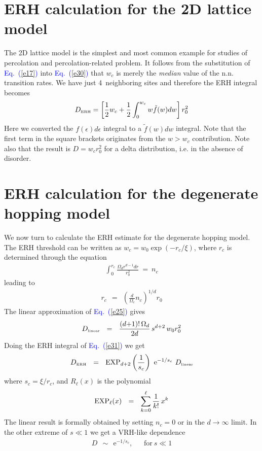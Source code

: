 \documentclass[onecolumn,fleqn,12pt,openany,draft]{book}
\newcommand{\eexp}{\mbox{e}^}
\newcommand{\tbox}[1]{\mbox{\tiny #1}}
\newcommand{\mylabel}[1]{\label{#1}}
\newcommand{\beq}{\begin{eqnarray}}
\newcommand{\eeq}{\end{eqnarray}}
\newcommand{\be}[1]{\begin{eqnarray}\ifthenelse{#1=-1}
{\nonumber}{\ifthenelse{#1=0}{}{\mylabel{e#1}}}}
\newcommand{\Eq}[1]{\textcolor{blue}{Eq.\!\!~(\ref{#1})}}
\newcommand{\Fig}[1]{\textcolor{blue}{Fig.}\!\!~\ref{#1}}
\newcommand{\hide}[1]{}
\begin{document}
\section{ERH calculation for the 2D lattice model}

The 2D lattice model is the simplest and most common example 
for studies of percolation and percolation-related problem. 
%
It follows from the substitution of \Eq{e17} into \Eq{e30}
that $w_c$ is merely the {\em median} value of the n.n. transition rates. 
We have just 4~neighboring sites and therefore the ERH integral becomes
%
\be{37}
D_{\tbox{ERH}} =  \left[\frac{1}{2}w_c + \frac{1}{2}\int_0^{w_c} w\tilde{f}(w) dw\right]r_0^2
\eeq
% 
Here we converted the $f(\epsilon)d\epsilon$ integral 
to a $\tilde{f}(w)dw$ integral.     
Note that the first term in the square brackets 
originates from the ${w>w_c}$ contribution.
Note also that the result is $D= w_c r_0^2$ for a delta 
distribution, i.e. in the absence of disorder. 


\hide{
We would like to test the validity of \Eq{e37}.
The purpose of this test is twofold: 
(i) to verify that the use of ${n_c=2}$  
indeed leads to a good estimate; 
(ii) to see whether the ERH estimate is indeed 
an improvement over the conventional estimate. 
The conventional estimate is just to use 
the median value leading to $D \approx w_c r_0^2$. 
%
For the purpose of numerical test we consider 
a uniform distribution of $\epsilon$ 
within ${[-\sigma,\sigma]}$. From \Eq{e37} we get 
%
\beq
D_{\tbox{ERH}} =  \left[\frac{1}{2} + \frac{1}{2\sigma}\left(1-\eexp{-\sigma}\right)\right] 
\, w_c \, r_0^2
\eeq
%
This formula is tested in \Fig{f3}.
}


\section{ERH calculation for the degenerate hopping model}
\label{sN}

We now turn to calculate the ERH estimate for the
degenerate hopping model. The ERH threshold 
can be written as  $w_c=w_0\exp(-r_c/\xi)$, 
where $r_c$ is determined through the equation  
%
\beq
\int_0^{r_c} \frac{\Omega_d r^{d-1} dr}{r_0^2} \ = \  n_c 
\eeq
%
leading to 
%
\beq
r_c  \ \ = \ \ \left(\frac{d}{\Omega_c}n_c\right)^{1/d}  r_0
\eeq
%
The linear approximation of \Eq{e25} gives 
%
\be{400}
D_{\tbox{linear}} \ \ = \ \  
\frac{(d{+}1)!\,\Omega_d}{2d} \, s^{d{+}2} \, w_0 r_0^2
\eeq
%
Doing the ERH integral of \Eq{e31} we get 
%
\be{40}
D_{\tbox{ERH}} \ \ = \ \  
\mathrm{EXP}_{d{+}2}\left(\frac{1}{s_c}\right)  \  \eexp{-1/s_c}  \ D_{\tbox{linear}}
\eeq
%
where $s_c=\xi/r_c$, and $R_{\ell}(x)$ is the polynomial
%
\be{41}
\mathrm{EXP}_{\ell}(x) \ \ = \ \ \sum_{k=0}^{\ell} \frac{1}{k!} \, x^k
\eeq
%
The linear result is formally obtained 
by setting ${n_c=0}$ or in the $d\rightarrow\infty$ limit. 
In the other extreme of ${s\ll1}$ 
we get a VRH-like dependence
%
\beq
D \ \ \sim \ \ \eexp{-1/s_c}, \ \ \ \ \ \ \ \text{for} \ s\ll1 
\eeq
\end{document}
